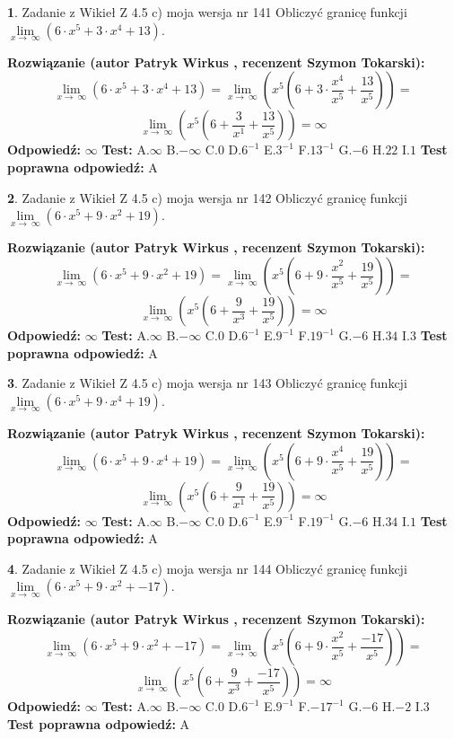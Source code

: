 \documentclass[12pt, a4paper]{article}
\theoremstyle{definition} %
\newtheorem{zad}{}
\newcommand{\zadStart}[1]{\begin{zad}#1\newline}
\newcommand{\zadStop}{\end{zad}}
\newcommand{\rozwStart}[2]{\noindent \textbf{Rozwiązanie (autor #1 , recenzent #2): }\newline}
\newcommand{\rozwStop}{\newline}
\newcommand{\odpStart}{\noindent \textbf{Odpowiedź:}\newline}
\newcommand{\odpStop}{\newline}
\newcommand{\testStart}{\noindent \textbf{Test:}\newline}
\newcommand{\testStop}{\newline}
\newcommand{\kluczStart}{\noindent \textbf{Test poprawna odpowiedź:}\newline}
\newcommand{\kluczStop}{\newline}
\begin{document}
\zadStart{Zadanie z Wikieł Z 4.5 c) moja wersja nr 141}
Obliczyć granicę funkcji  $\lim\limits_{x\to\ \infty}(6 \cdot x^{5}+3 \cdot x^{4}+13)$.
\zadStop
\rozwStart{Patryk Wirkus}{Szymon Tokarski}
$$\lim\limits_{x\to\ \infty}(6 \cdot x^{5}+3 \cdot x^{4}+13) = \lim\limits_{x\to\ \infty}(x^{5}(6 +3 \cdot \frac{x^{4}}{x^{5}}+\frac{13}{x^{5}})) =$$ $$\lim\limits_{x\to\ \infty}(x^{5}(6 +\frac{3}{x^{1}}+\frac{13}{x^{5}})) =\infty$$
\rozwStop
\odpStart
$\infty$
\odpStop
\testStart
A.$\infty$ B.$-\infty$ C.$0$ D.$6^{-1}$ E.$3^{-1}$
F.$13^{-1}$ G.$-6$
H.$22$
I.$1$
\testStop
\kluczStart
A
\kluczStop



\zadStart{Zadanie z Wikieł Z 4.5 c) moja wersja nr 142}
Obliczyć granicę funkcji  $\lim\limits_{x\to\ \infty}(6 \cdot x^{5}+9 \cdot x^{2}+19)$.
\zadStop
\rozwStart{Patryk Wirkus}{Szymon Tokarski}
$$\lim\limits_{x\to\ \infty}(6 \cdot x^{5}+9 \cdot x^{2}+19) = \lim\limits_{x\to\ \infty}(x^{5}(6 +9 \cdot \frac{x^{2}}{x^{5}}+\frac{19}{x^{5}})) =$$ $$\lim\limits_{x\to\ \infty}(x^{5}(6 +\frac{9}{x^{3}}+\frac{19}{x^{5}})) =\infty$$
\rozwStop
\odpStart
$\infty$
\odpStop
\testStart
A.$\infty$ B.$-\infty$ C.$0$ D.$6^{-1}$ E.$9^{-1}$
F.$19^{-1}$ G.$-6$
H.$34$
I.$3$
\testStop
\kluczStart
A
\kluczStop



\zadStart{Zadanie z Wikieł Z 4.5 c) moja wersja nr 143}
Obliczyć granicę funkcji  $\lim\limits_{x\to\ \infty}(6 \cdot x^{5}+9 \cdot x^{4}+19)$.
\zadStop
\rozwStart{Patryk Wirkus}{Szymon Tokarski}
$$\lim\limits_{x\to\ \infty}(6 \cdot x^{5}+9 \cdot x^{4}+19) = \lim\limits_{x\to\ \infty}(x^{5}(6 +9 \cdot \frac{x^{4}}{x^{5}}+\frac{19}{x^{5}})) =$$ $$\lim\limits_{x\to\ \infty}(x^{5}(6 +\frac{9}{x^{1}}+\frac{19}{x^{5}})) =\infty$$
\rozwStop
\odpStart
$\infty$
\odpStop
\testStart
A.$\infty$ B.$-\infty$ C.$0$ D.$6^{-1}$ E.$9^{-1}$
F.$19^{-1}$ G.$-6$
H.$34$
I.$1$
\testStop
\kluczStart
A
\kluczStop



\zadStart{Zadanie z Wikieł Z 4.5 c) moja wersja nr 144}
Obliczyć granicę funkcji  $\lim\limits_{x\to\ \infty}(6 \cdot x^{5}+9 \cdot x^{2}+-17)$.
\zadStop
\rozwStart{Patryk Wirkus}{Szymon Tokarski}
$$\lim\limits_{x\to\ \infty}(6 \cdot x^{5}+9 \cdot x^{2}+-17) = \lim\limits_{x\to\ \infty}(x^{5}(6 +9 \cdot \frac{x^{2}}{x^{5}}+\frac{-17}{x^{5}})) =$$ $$\lim\limits_{x\to\ \infty}(x^{5}(6 +\frac{9}{x^{3}}+\frac{-17}{x^{5}})) =\infty$$
\rozwStop
\odpStart
$\infty$
\odpStop
\testStart
A.$\infty$ B.$-\infty$ C.$0$ D.$6^{-1}$ E.$9^{-1}$
F.$-17^{-1}$ G.$-6$
H.$-2$
I.$3$
\testStop
\kluczStart
A
\kluczStop
\end{document}
